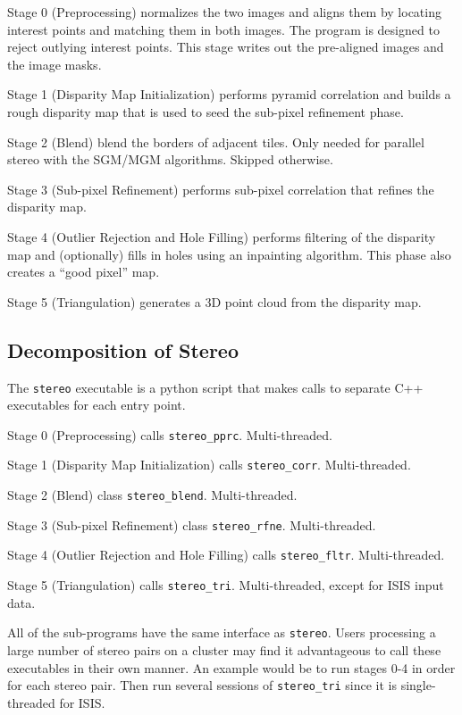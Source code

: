 Stage 0 (Preprocessing) normalizes the two images and aligns them
by locating interest points and matching them in both images. The
program is designed to reject outlying interest points.  This stage
writes out the pre-aligned images and the image masks.

Stage 1 (Disparity Map Initialization) performs pyramid correlation and builds a rough disparity map that is used to seed the sub-pixel refinement phase.

Stage 2 (Blend) blend the borders of adjacent tiles.  Only needed for parallel stereo
with the SGM/MGM algorithms.  Skipped otherwise.

Stage 3 (Sub-pixel Refinement) performs sub-pixel correlation that
refines the disparity map.

Stage 4 (Outlier Rejection and Hole Filling) performs filtering of the
disparity map and (optionally) fills in holes using an inpainting
algorithm.  This phase also creates a ``good pixel'' map.

Stage 5 (Triangulation) generates a 3D point cloud from the disparity
map.

\subsection{Decomposition of Stereo}
\label{stereo_dec}

The \texttt{stereo}
executable is a python script that makes calls to separate
C++ executables for each entry point.

Stage 0 (Preprocessing) calls \texttt{stereo\_pprc}. Multi-threaded.

Stage 1 (Disparity Map Initialization) calls
\texttt{stereo\_corr}. Multi-threaded.

Stage 2 (Blend) class \texttt{stereo\_blend}. Multi-threaded.

Stage 3 (Sub-pixel Refinement) class \texttt{stereo\_rfne}. Multi-threaded.

Stage 4 (Outlier Rejection and Hole Filling) calls
\texttt{stereo\_fltr}. Multi-threaded.

Stage 5 (Triangulation) calls \texttt{stereo\_tri}. Multi-threaded,
except for ISIS input data.

All of the sub-programs have the same interface as
\texttt{stereo}. Users processing a large number of stereo pairs on a
cluster may find it advantageous to call these executables in their own
manner. An example would be to run stages 0-4 in order for each stereo
pair. Then run several sessions of \texttt{stereo\_tri} since it is
single-threaded for ISIS.


